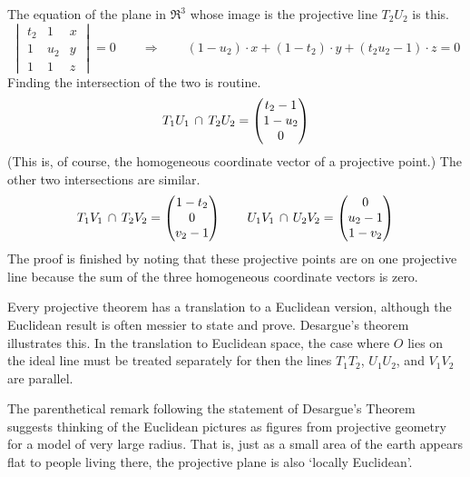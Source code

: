 The equation of the 
plane in $\Re^3$ whose image is the projective line $T_2U_2$ is this.
\begin{equation*}
  \begin{vmatrix}
    t_2  &1    &x  \\
    1    &u_2  &y  \\
    1    &1    &z
  \end{vmatrix}=0
  \qquad
  \Longrightarrow
  \qquad
  (1-u_2)\cdot x+(1-t_2)\cdot y+(t_2u_2-1)\cdot z=0
\end{equation*}
Finding the intersection of the two is routine.
\begin{equation*}
  T_1U_1\,\cap\, T_2U_2
  =\begin{pmatrix} t_2-1 \\ 1-u_2 \\ 0 \end{pmatrix}
\end{equation*}
(This is, of course, the homogeneous coordinate vector of a projective point.)
The other two intersections are similar.
\begin{equation*}
  T_1V_1\,\cap\, T_2V_2
  =\begin{pmatrix} 1-t_2 \\ 0 \\ v_2-1 \end{pmatrix}
  \qquad
  U_1V_1\,\cap\, U_2V_2
  =\begin{pmatrix} 0 \\ u_2-1 \\ 1-v_2 \end{pmatrix}
\end{equation*}
The proof is finished by noting that
these projective points are on one projective line because
the sum of the three homogeneous coordinate vectors is zero.

Every projective theorem has a translation to a Euclidean version, although 
the Euclidean result is often messier to state and prove.
Desargue's theorem illustrates this.
In the translation to Euclidean space, the case
where $O$ lies on the ideal line must be treated separately for then the lines
$T_1T_2$, $U_1U_2$, and $V_1V_2$ are parallel.

The parenthetical remark
following the statement of Desargue's Theorem suggests thinking
of the Euclidean pictures as figures from projective geometry 
for a model of very large radius.
That is, just as a small area of the earth appears flat to people living there,
the projective plane is also `locally Euclidean'.


